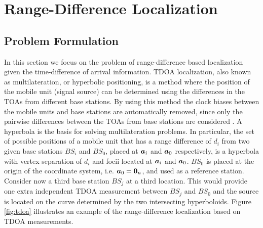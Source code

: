 
\section{Range-Difference Localization}

\subsection{Problem Formulation}


In this section we focus on the problem of range-difference based localization given the time-difference of arrival information. TDOA localization, also known as multilateration, or hyperbolic positioning, is a method where the position of the mobile unit (signal source) can be determined using the differences in the TOAs from different base stations. By using this method the clock biases between the mobile units and base stations are automatically removed, since only the pairwise differences between the TOAs from base stations are  considered \cite{LocAlg}.  A hyperbola is the basis for solving multilateration problems. In particular, the set of possible positions of a mobile unit that has a range difference of $d_i$ from two given base stations $BS_i$ and $BS_0$, placed at $\mbox{\boldmath$a$}_i$ and $\mbox{\boldmath$a$}_0$ respectively, is a hyperbola with vertex separation of $d_i$ and focii located at $\mbox{\boldmath$a$}_i$ and $\mbox{\boldmath$a$}_0$. $BS_0$ is placed at the origin of the coordinate system, i.e. $\mbox{\boldmath$a$}_0 = \mbox{\boldmath${0}$}_n$, and used as a reference station. Consider now a third base station $BS_j$ at a third location. This would provide one extra independent TDOA measurement between $BS_j$ and $BS_0$ and the source is located on the curve determined by the two intersecting hyperboloids. Figure \ref{fig:tdoa} illustrates an example of the range-difference localization based on TDOA measurements.

